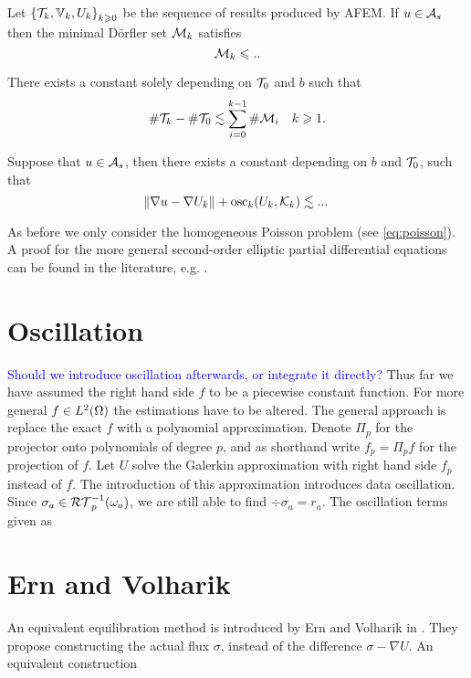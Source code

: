 \documentclass[thesis.tex]{subfiles}
\begin{document}
\begin{lem}
  Let $\set{\mathcal{T}_k, \mathbb{V}_k, U_k}_{k \geqslant 0}$ be the sequence of results produced by AFEM. If $u \in \mathcal{A}_s$ then the minimal D\"orfler set $\mathcal{M}_k$ satisfies
  \[
    \mathcal{M}_k \leqslant ..
  \]
\end{lem}

\begin{lem}
  There exists a constant solely depending on $\mathcal{T}_0$ and $b$ such that
  \[
    \# \mathcal{T}_k - \# \mathcal{T}_0 \lesssim \sum_{i = 0}^{k-1} \# \mathcal{M}_i \quad k \geqslant 1.
  \]
\end{lem}

\begin{lem}
  Suppose that $u \in \mathcal{A}_s$, then there exists a constant depending on $b$ and $\mathcal{T}_0$, such that
  \[
    \norm{\nabla u - \nabla U_k} + \operatorname{osc}_k(U_k, \mathcal{K}_k) \lesssim ...
  \]
\end{lem}

 As before we  only consider the homogeneous
Poisson problem (see \eqref{eq:poisson}). A proof for the more general second-order elliptic partial differential equations can be
found in the literature, e.g. \cite{cascon2008, cascon2012}.
\section{Oscillation}
\textcolor{blue}{Should we introduce oscillation afterwards, or integrate it directly?}
Thus far we have assumed the right hand side $f$ to be a piecewise constant function. For more general $f \in L^2(\Omega)$ the
estimations have to be altered. The general approach is replace the exact $f$ with a polynomial approximation. Denote
$\Pi_{p}$ for the projector onto polynomials of degree $p$, and as shorthand write $f_p = \Pi_p f$ for the projection of $f$. 
Let $U$  solve the Galerkin approximation with right hand side $f_p$ instead of $f$. The introduction of this approximation
introduces data oscillation. Since $\sigma_a \in \mathcal{RT}_p^{-1}(\omega_a)$, we are still able to find $\div \sigma_a = r_a$. 
The oscillation terms given as




\section{Ern and Volharik}
An equivalent equilibration method is introduced by Ern and Volharik in \cite{ernequil}. They
propose constructing the actual flux $\sigma$, instead of the difference $\sigma - \nabla U$. 
An equivalent construction 
\end{document}
